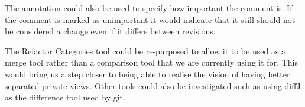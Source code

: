 The annotation could also be used to specify how important the comment is. If the comment is marked as unimportant it would indicate that it still should not be considered a change even if it differs between revisions.

The Refactor Categories tool could be re-purposed to allow it to be used as a merge tool rather than a comparison tool that we are currently using it for.  This would bring us a step closer to being able to realise the vision of having better separated private views.  Other tools could also be investigated such as using diffJ as the difference tool used by git.
% 
% 
% 
% 
% 
